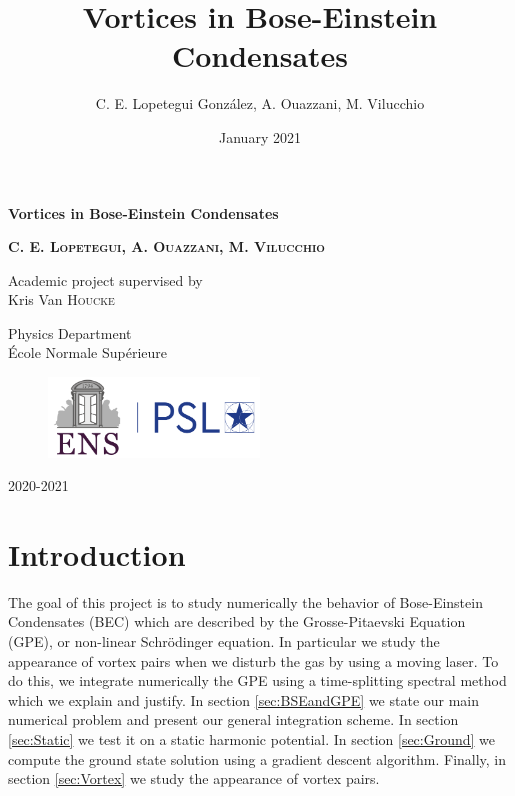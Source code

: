 \documentclass{article}
\title{Vortices in Bose-Einstein Condensates}
\author{C. E. Lopetegui González, A. Ouazzani, M. Vilucchio}
\date{January 2021}
\begin{document}
\begin{titlepage}
    \begin{center}
        \vspace*{1cm}
            
        \Huge
        \textbf{Vortices in Bose-Einstein Condensates}
            
        \vspace{1.5cm}
        
        \Large    
        \textbf{C. E. \textsc{Lopetegui}, A. \textsc{Ouazzani}, M. \textsc{Vilucchio}}
            
        \vspace{1.5cm}
        
        \large  
        Academic project supervised by\\
        Kris Van \textsc{Houcke}
        
            
        \vfill
            
            
        \large
        Physics Department\\
        École Normale Supérieure\\
        
        \begin{figure}[!ht]
        \centering
        \includegraphics[width=0.5\textwidth]{logo.png}
        \end{figure}
        
        \vspace{0.5cm}
        2020-2021            
    \end{center}
\end{titlepage}


\newpage

\tableofcontents


\newpage

\section*{Introduction}\label{sec:Intro}
The goal of this project is to study numerically the behavior of Bose-Einstein Condensates (BEC) which are described by the Grosse-Pitaevski Equation (GPE), or non-linear Schrödinger equation. In particular we study the appearance of vortex pairs when we disturb the gas by using a moving laser. To do this, we integrate numerically the GPE using a time-splitting spectral method which we explain and justify. In section \ref{sec:BSEandGPE} we state our main numerical problem and present our general integration scheme. In section \ref{sec:Static} we test it on a static harmonic potential. In section \ref{sec:Ground} we compute the ground state solution using a gradient descent algorithm. Finally, in section \ref{sec:Vortex} we study the appearance of vortex pairs.
\end{document}
